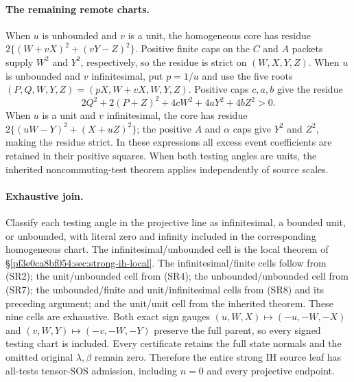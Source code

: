 \paragraph{The remaining remote charts.}
When $u$ is unbounded and $v$ is a unit, the homogeneous core has
residue $2\{(W+vX)^2+(vY-Z)^2\}$. Positive finite caps on the $C$
and $A$ packets supply $W^2$ and $Y^2$, respectively, so the residue
is strict on $(W,X,Y,Z)$. When $u$ is unbounded and $v$ infinitesimal,
put $p=1/u$ and use the five roots
$(P,Q,W,Y,Z)=(pX,W+vX,W,Y,Z)$. Positive caps $c,a,b$ give the residue
\[
 2Q^2+2(P+Z)^2+4cW^2+4aY^2+4bZ^2>0.
\tag{SR8}
\]
When $u$ is a unit and $v$ infinitesimal, the core has residue
$2\{(uW-Y)^2+(X+uZ)^2\}$; the positive $A$ and $\alpha$ caps give
$Y^2$ and $Z^2$, making the residue strict. In these expressions all
excess event coefficients are retained in their positive squares.
When both testing angles are units, the inherited noncommuting-test
theorem applies independently of source scales.

\paragraph{Exhaustive join.}
Classify each testing angle in the projective line as infinitesimal,
a bounded unit, or unbounded, with literal zero and infinity included
in the corresponding homogeneous chart. The infinitesimal/unbounded
cell is the local theorem of \S\ref{pf3e0ca8bf054:sec:strong-ih-local}.
The infinitesimal/finite cells follow from (SR2); the unit/unbounded
cell from (SR4); the unbounded/unbounded cell from (SR7); the
unbounded/finite and unit/infinitesimal cells from (SR8) and its
preceding argument; and the unit/unit cell from the inherited theorem.
These nine cells are exhaustive. Both exact sign gauges
$(u,W,X)\mapsto(-u,-W,-X)$ and
$(v,W,Y)\mapsto(-v,-W,-Y)$ preserve the full parent, so every
signed testing chart is included. Every certificate retains the full
state normals and the omitted original $\lambda,\beta$ remain zero.
Therefore the entire strong IH source leaf has all-tests tensor-SOS
admission, including $n=0$ and every projective endpoint.
